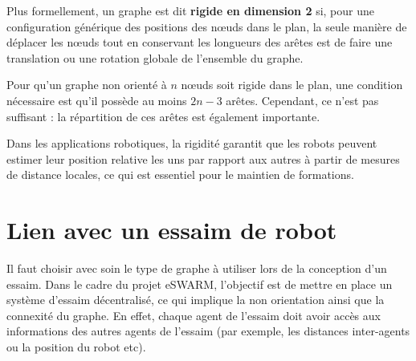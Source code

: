 Plus formellement, un graphe est dit \textbf{rigide en dimension 2} si, pour une configuration générique des positions des nœuds dans le plan, la seule manière de déplacer les nœuds tout en conservant les longueurs des arêtes est de faire une translation ou une rotation globale de l’ensemble du graphe.

Pour qu’un graphe non orienté à $n$ nœuds soit rigide dans le plan, une condition nécessaire est qu’il possède au moins $2n - 3$ arêtes. Cependant, ce n’est pas suffisant : la répartition de ces arêtes est également importante.

Dans les applications robotiques, la rigidité garantit que les robots peuvent estimer leur position relative les uns par rapport aux autres à partir de mesures de distance locales, ce qui est essentiel pour le maintien de formations.


\section{Lien avec un essaim de robot }

Il faut choisir avec soin le type de graphe à utiliser lors de la conception d'un essaim. Dans le cadre du projet eSWARM, l'objectif est de mettre en place un système d'essaim décentralisé, ce qui implique la non orientation ainsi que la connexité du graphe. En effet, chaque agent de l'essaim doit avoir accès aux informations des autres agents de l'essaim (par exemple, les distances inter-agents ou la position du robot etc).